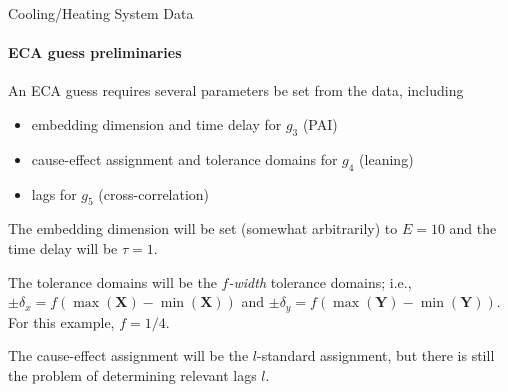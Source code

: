 \documentclass{beamer}
\begin{document}
\begin{frame}{Cooling/Heating System Data}
\framesubtitle{ECA guess preliminaries}
An ECA guess requires several parameters be set from the data, including
\pause
\begin{itemize}
\item embedding dimension and time delay for $g_3$ (PAI)
\pause
\item cause-effect assignment and tolerance domains for $g_4$ (leaning)
\pause
\item lags for $g_5$ (cross-correlation)
\end{itemize}
\pause
\vspace{0.1in}
The embedding dimension will be set (somewhat arbitrarily) to $E=10$ and the time delay will be $\tau=1$.
\pause
\vspace{0.1in}

The tolerance domains will be the {\em $f$-width} tolerance domains; i.e., $\pm\delta_x=f(\max(\mathbf{X})-\min(\mathbf{X}))$ and $\pm\delta_y=f(\max(\mathbf{Y})-\min(\mathbf{Y}))$.  For this example, $f=1/4$.
\pause
\vspace{0.1in}

The cause-effect assignment will be the $l$-standard assignment, but \alert{there is still the problem of determining relevant lags $l$}.

\end{frame}
\end{document}
